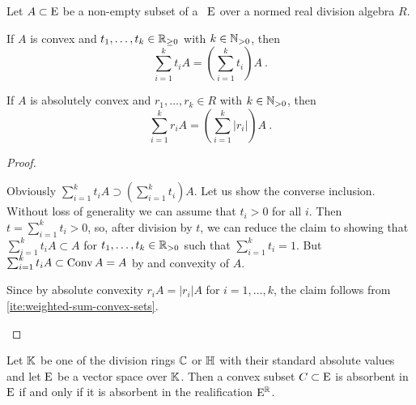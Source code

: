 \begin{lemma}\label{thm:weighted-sum-convex-absolutely-convex-sets}
  Let $A \subset \mathrm{E}$ be a non-empty subset of a \tvs~$\mathrm{E}$
  over a normed real division algebra $R$. 
  \begin{romanlist}
  \item\label{ite:weighted-sum-convex-sets}
    If $A$ is convex and $t_1,\ldots, t_k\in \mathbb{R}_{\geq 0}$ with $k\in \mathbb{N}_{> 0}$, then
    \[
       \sum_{i=1}^k t_iA = \left( \sum_{i=1}^k t_i \right) A \ .
    \]
  \item
    If $A$ is absolutely convex and $r_1,\ldots, r_k\in R$ with $k\in \mathbb{N}_{> 0}$, then
    \[
       \sum_{i=1}^k r_iA = \left( \sum_{i=1}^k |r_i| \right) A \ .
    \]   
  \end{romanlist}
\end{lemma}

\begin{proof}
  \begin{adromanlist}
  \item
    Obviously $\sum_{i=1}^k t_iA \supset \left( \sum_{i=1}^k t_i \right) A$.
    Let us show the converse  inclusion. Without loss of generality we can
    assume that $t_i > 0$ for all $i$. Then $t = \sum_{i=1}^k t_i >0$,
    so, after division by $t$, we can reduce the claim to showing that
    $\sum_{i=1}^k t_iA \subset A$ for $t_1,\ldots , t_k\in \mathbb{R}_{>0}$ such that
    $\sum_{i=1}^k t_i =1$.
    But $\sum_{i=1}^k t_iA \subset \operatorname{Conv} A = A$ by
     and
    convexity of $A$. 
  \item
    Since by absolute convexity $r_i A = |r_i|A$ for $i=1,\ldots,k$, the claim
    follows from \ref{ite:weighted-sum-convex-sets}.
  \end{adromanlist}
\end{proof}

\begin{lemma}\label{thm:real-absorbance-implies-arbsorbance-finite-dimensional-divison-algebra}
  Let $\mathbb{K}$ be one of the division rings $\mathbb{C}$ or $\mathbb{H}$ with their standard absolute values
  and let $\mathrm{E}$ be a vector space over $\mathbb{K}$. Then a convex subset $C\subset \mathrm{E}$ is
  absorbent in $\mathrm{E}$ if and only if it is absorbent in the realification $\mathrm{E}^{\mathbb{R}}$.
\end{lemma}

